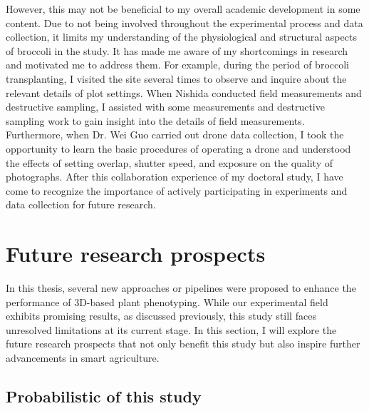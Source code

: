  However, this may not be beneficial to my overall academic development in some content. 
  Due to not being involved throughout the experimental process and data collection, it limits my understanding of the physiological and structural aspects of broccoli in the study. 
  It has made me aware of my shortcomings in research and motivated me to address them. 
  For example, during the period of broccoli transplanting, I visited the site several times to observe and inquire about the relevant details of plot settings. 
  When Nishida conducted field measurements and destructive sampling, I assisted with some measurements and destructive sampling work to gain insight into the details of field measurements. 
  Furthermore, when Dr. Wei Guo carried out drone data collection, I took the opportunity to learn the basic procedures of operating a drone and understood the effects of setting overlap, shutter speed, and exposure on the quality of photographs. 
  After this collaboration experience of my doctoral study, I have come to recognize the importance of actively participating in experiments and data collection for future research.



% 


\section{Future research prospects} \label{sec:respros}

In this thesis, several new approaches or pipelines were proposed to enhance the performance of 3D-based plant phenotyping. 
While our experimental field exhibits promising results, as discussed previously, this study still faces unresolved limitations at its current stage. 
In this section, I will explore the future research prospects that not only benefit this study but also inspire further advancements in smart agriculture.

\subsection{Probabilistic of this study}\label{sec:thistudy}


